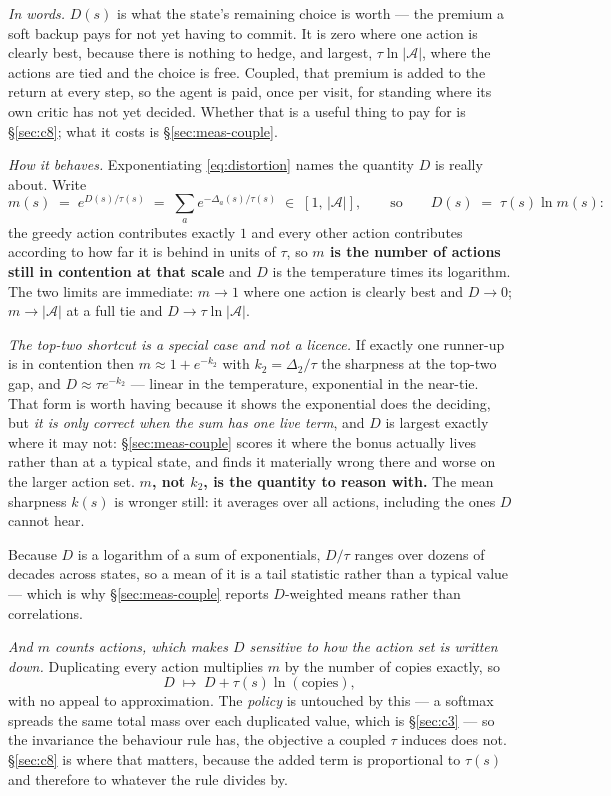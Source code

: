 \documentclass{article}
\newcommand{\actions}{\mathcal{A}}
\newcommand{\gap}{\Delta}
\begin{document}
\emph{In words.} $D(s)$ is what the state's remaining choice is worth --- the premium a soft
backup pays for not yet having to commit. It is zero where one action is clearly best, because
there is nothing to hedge, and largest, $\tau\ln|\actions|$, where the actions are tied and the
choice is free. Coupled, that premium is added to the return at every step, so the agent is paid,
once per visit, for standing where its own critic has not yet decided. Whether that is a useful
thing to pay for is \S\ref{sec:c8}; what it costs is \S\ref{sec:meas-couple}.

\emph{How it behaves.} Exponentiating \eqref{eq:distortion} names the quantity $D$ is really
about. Write
\[
  m(s) \;=\; e^{D(s)/\tau(s)} \;=\; \sum_a e^{-\gap_a(s)/\tau(s)} \;\in\; [1,\,|\actions|],
  \qquad\text{so}\qquad D(s) \;=\; \tau(s)\ln m(s):
\]
the greedy action contributes exactly $1$ and every other action contributes according to how
far it is behind in units of $\tau$, so \textbf{$m$ is the number of actions still in contention
at that scale} and $D$ is the temperature times its logarithm. The two limits are immediate:
$m \to 1$ where one action is clearly best and $D \to 0$; $m \to |\actions|$ at a full tie and
$D \to \tau\ln|\actions|$.

\emph{The top-two shortcut is a special case and not a licence.} If exactly one runner-up is in
contention then $m \approx 1 + e^{-k_2}$ with $k_2 = \gap_2/\tau$ the sharpness at the top-two
gap, and $D \approx \tau e^{-k_2}$ --- linear in the temperature, exponential in the near-tie.
That form is worth having because it shows the exponential does the deciding, but \emph{it is
only correct when the sum has one live term}, and $D$ is largest exactly where it may not:
\S\ref{sec:meas-couple} scores it where the bonus actually lives rather than at a typical state,
and finds it materially wrong there and worse on the larger action set. \textbf{$m$, not $k_2$,
is the quantity to reason with.} The mean sharpness $k(s)$ is wronger still: it averages over all
actions, including the ones $D$ cannot hear.

Because $D$ is a logarithm of a sum of exponentials, $D/\tau$ ranges over dozens of decades
across states, so a mean of it is a tail statistic rather than a typical value --- which is why
\S\ref{sec:meas-couple} reports $D$-weighted means rather than correlations.

\emph{And $m$ counts actions, which makes $D$ sensitive to how the action set is written down.}
Duplicating every action multiplies $m$ by the number of copies exactly, so
\[
  D \;\longmapsto\; D + \tau(s)\ln(\text{copies}),
\]
with no appeal to approximation. The \emph{policy} is untouched by this --- a softmax spreads the
same total mass over each duplicated value, which is \S\ref{sec:c3} --- so the invariance the
behaviour rule has, the objective a coupled $\tau$ induces does not. \S\ref{sec:c8} is where that
matters, because the added term is proportional to $\tau(s)$ and therefore to whatever the rule
divides by.
\end{document}
